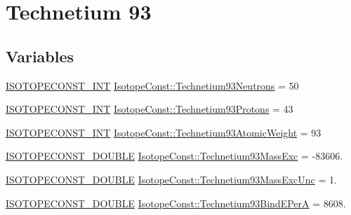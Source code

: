 \hypertarget{group___isotope_const-_technetium-_tc93}{}\section{Technetium 93}
\label{group___isotope_const-_technetium-_tc93}
\subsection*{Variables}
\begin{DoxyCompactItemize}
\item 
\mbox{\hyperlink{group___isotope_const-_macros_ga5f18360b3e99483a35c32d789e62621c}{I\+S\+O\+T\+O\+P\+E\+C\+O\+N\+S\+T\+\_\+\+I\+NT}} \mbox{\hyperlink{group___isotope_const-_technetium-_tc93_ga25fe38844b61c08af17c236afd3ec532}{Isotope\+Const\+::\+Technetium93\+Neutrons}} = 50
\item 
\mbox{\hyperlink{group___isotope_const-_macros_ga5f18360b3e99483a35c32d789e62621c}{I\+S\+O\+T\+O\+P\+E\+C\+O\+N\+S\+T\+\_\+\+I\+NT}} \mbox{\hyperlink{group___isotope_const-_technetium-_tc93_gaf98a967b2afec74bcb7c58c896ef3bfc}{Isotope\+Const\+::\+Technetium93\+Protons}} = 43
\item 
\mbox{\hyperlink{group___isotope_const-_macros_ga5f18360b3e99483a35c32d789e62621c}{I\+S\+O\+T\+O\+P\+E\+C\+O\+N\+S\+T\+\_\+\+I\+NT}} \mbox{\hyperlink{group___isotope_const-_technetium-_tc93_ga72a52e61b07156ac367dad0bcc0ec991}{Isotope\+Const\+::\+Technetium93\+Atomic\+Weight}} = 93
\item 
\mbox{\hyperlink{group___isotope_const-_macros_ga8f45a7272ce02c0b4c65c44636ed719a}{I\+S\+O\+T\+O\+P\+E\+C\+O\+N\+S\+T\+\_\+\+D\+O\+U\+B\+LE}} \mbox{\hyperlink{group___isotope_const-_technetium-_tc93_gaf111bf657a6cfb8ea43e5a3fef315f92}{Isotope\+Const\+::\+Technetium93\+Mass\+Exc}} = -\/83606.
\item 
\mbox{\hyperlink{group___isotope_const-_macros_ga8f45a7272ce02c0b4c65c44636ed719a}{I\+S\+O\+T\+O\+P\+E\+C\+O\+N\+S\+T\+\_\+\+D\+O\+U\+B\+LE}} \mbox{\hyperlink{group___isotope_const-_technetium-_tc93_ga592db7cea9049ca6cbf7423457856f6f}{Isotope\+Const\+::\+Technetium93\+Mass\+Exc\+Unc}} = 1.
\item 
\mbox{\hyperlink{group___isotope_const-_macros_ga8f45a7272ce02c0b4c65c44636ed719a}{I\+S\+O\+T\+O\+P\+E\+C\+O\+N\+S\+T\+\_\+\+D\+O\+U\+B\+LE}} \mbox{\hyperlink{group___isotope_const-_technetium-_tc93_ga5df16095451d71a42bea71ad4302843f}{Isotope\+Const\+::\+Technetium93\+Bind\+E\+PerA}} = 8608.
\item 

\end{DoxyCompactItemize}

